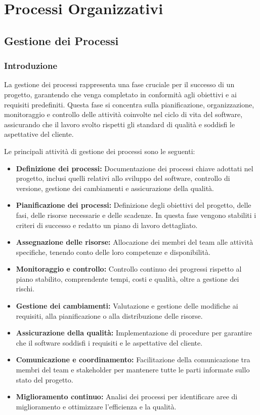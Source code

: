 \section{Processi Organizzativi}

\subsection{Gestione dei Processi}

\subsubsection{Introduzione}
La gestione dei processi rappresenta una fase cruciale per il successo di un progetto, garantendo che venga completato in conformità agli obiettivi e ai requisiti predefiniti. Questa fase si concentra sulla pianificazione, organizzazione, monitoraggio e controllo delle attività coinvolte nel ciclo di vita del software, assicurando che il lavoro svolto rispetti gli standard di qualità e soddisfi le aspettative del cliente. 

Le principali attività di gestione dei processi sono le seguenti:
\begin{itemize}
    \item \textbf{Definizione dei processi:} Documentazione dei processi chiave adottati nel progetto, inclusi quelli relativi allo sviluppo del software, controllo di versione, gestione dei cambiamenti e assicurazione della qualità.
    \item \textbf{Pianificazione dei processi:} Definizione degli obiettivi del progetto, delle fasi, delle risorse necessarie e delle scadenze. In questa fase vengono stabiliti i criteri di successo e redatto un piano di lavoro dettagliato.
    \item \textbf{Assegnazione delle risorse:} Allocazione dei membri del team alle attività specifiche, tenendo conto delle loro competenze e disponibilità.
    \item \textbf{Monitoraggio e controllo:} Controllo continuo dei progressi rispetto al piano stabilito, comprendente tempi, costi e qualità, oltre a gestione dei rischi.
    \item \textbf{Gestione dei cambiamenti:} Valutazione e gestione delle modifiche ai requisiti, alla pianificazione o alla distribuzione delle risorse.
    \item \textbf{Assicurazione della qualità:} Implementazione di procedure per garantire che il software soddisfi i requisiti e le aspettative del cliente.
    \item \textbf{Comunicazione e coordinamento:} Facilitazione della comunicazione tra membri del team e stakeholder per mantenere tutte le parti informate sullo stato del progetto.
    \item \textbf{Miglioramento continuo:} Analisi dei processi per identificare aree di miglioramento e ottimizzare l’efficienza e la qualità.
\end{itemize}

